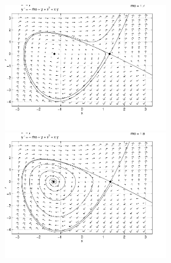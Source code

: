 \documentclass{ximera}
\begin{document}
\begin{computerExercise}
\begin{solution}
\begin{figure}[htb]
                       \centerline{%
                       \includegraphics[width=2.75in]{exfigure/9-7-5a.pdf}
                       \includegraphics[width=2.75in]{exfigure/9-7-5b.pdf}}
\end{figure}

\end{solution}
\end{computerExercise}
\end{document}
